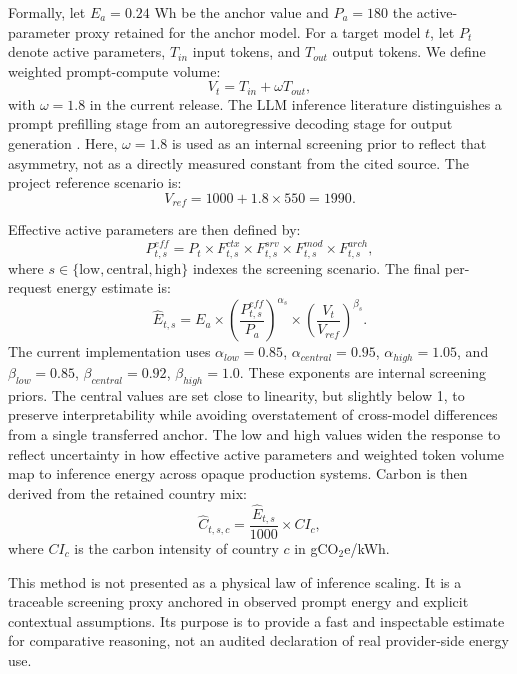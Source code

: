 \documentclass[runningheads]{llncs}
\begin{document}
Formally, let $E_a = 0.24$ Wh be the anchor value and $P_a = 180$ the active-parameter proxy retained for the anchor model. For a target model $t$, let $P_t$ denote active parameters, $T_{in}$ input tokens, and $T_{out}$ output tokens. We define weighted prompt-compute volume:
\begin{equation}
V_t = T_{in} + \omega T_{out},
\end{equation}
with $\omega = 1.8$ in the current release. The LLM inference literature distinguishes a prompt prefilling stage from an autoregressive decoding stage for output generation \cite{zhou2024survey}. Here, $\omega = 1.8$ is used as an internal screening prior to reflect that asymmetry, not as a directly measured constant from the cited source. The project reference scenario is:
\begin{equation}
V_{ref} = 1000 + 1.8 \times 550 = 1990.
\end{equation}

Effective active parameters are then defined by:
\begin{equation}
P^{eff}_{t,s} = P_t \times F^{ctx}_{t,s} \times F^{srv}_{t,s} \times F^{mod}_{t,s} \times F^{arch}_{t,s},
\end{equation}
where $s \in \{\mathrm{low}, \mathrm{central}, \mathrm{high}\}$ indexes the screening scenario. The final per-request energy estimate is:
\begin{equation}
\hat{E}_{t,s} = E_a \times \left(\frac{P^{eff}_{t,s}}{P_a}\right)^{\alpha_s}
\times \left(\frac{V_t}{V_{ref}}\right)^{\beta_s}.
\end{equation}
The current implementation uses $\alpha_{low}=0.85$, $\alpha_{central}=0.95$, $\alpha_{high}=1.05$, and $\beta_{low}=0.85$, $\beta_{central}=0.92$, $\beta_{high}=1.0$. These exponents are internal screening priors. The central values are set close to linearity, but slightly below 1, to preserve interpretability while avoiding overstatement of cross-model differences from a single transferred anchor. The low and high values widen the response to reflect uncertainty in how effective active parameters and weighted token volume map to inference energy across opaque production systems. Carbon is then derived from the retained country mix:
\begin{equation}
\hat{C}_{t,s,c} = \frac{\hat{E}_{t,s}}{1000} \times CI_c,
\end{equation}
where $CI_c$ is the carbon intensity of country $c$ in gCO$_2$e/kWh.

This method is not presented as a physical law of inference scaling. It is a traceable screening proxy anchored in observed prompt energy and explicit contextual assumptions. Its purpose is to provide a fast and inspectable estimate for comparative reasoning, not an audited declaration of real provider-side energy use.
\end{document}

